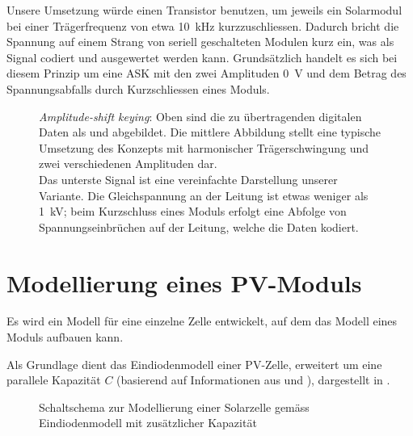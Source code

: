Unsere Umsetzung w\"urde einen Transistor  benutzen, um jeweils ein Solarmodul
bei  einer Tr\"agerfrequenz  von  etwa \SI{10}{\kilo\hertz}  kurzzuschliessen.
Dadurch bricht die Spannung auf  einem Strang von seriell geschalteten Modulen
kurz ein, was als Signal  codiert und ausgewertet werden kann. Grunds\"atzlich
handelt  es sich  bei  diesem Prinzip  um  eine ASK  mit  den zwei  Amplituden
\SI{0}{\volt} und  dem Betrag des Spannungsabfalls  durch Kurzschliessen eines
Moduls.

\begin{figure}[h!tb]
    \centering
    
    \caption{%
        \emph{Amplitude-shift  keying}: Oben   sind  die   zu  \"ubertragenden
        digitalen  Daten als   und   abgebildet. Die  mittlere
        Abbildung stellt eine typische Umsetzung des Konzepts mit harmonischer
        Tr\"agerschwingung und zwei verschiedenen Amplituden dar.\protect\\
        Das  unterste   Signal  ist  eine  vereinfachte   Darstellung  unserer
        Variante.  Die  Gleichspannung an  der Leitung  ist etwas  weniger als
        \SI{1}{\kilo\volt}; beim Kurzschluss eines Moduls erfolgt eine Abfolge
        von Spannungseinbr\"uchen auf der Leitung, welche die Daten kodiert.%
    }
    \label{fig:ask:concept}
\end{figure}


\clearpage
\section{Modellierung eines PV-Moduls}
\label{sec:simu:model:module}

Es wird  ein Modell f\"ur eine  einzelne Zelle entwickelt, auf  dem das Modell
eines  Moduls  aufbauen  kann.

Als   Grundlage   dient   das  Eindiodenmodell   einer   PV-Zelle,   erweitert
um   eine  parallele   Kapazit\"at  $C$   (basierend  auf   Informationen  aus
\cite{ref:solar:scofield}   und   \cite{ref:solar:friesen}),  dargestellt   in
.

\begin{figure}[h!tb]
    \centering
    
    \caption{%
        Schaltschema    zur    Modellierung    einer    Solarzelle    gem\"ass
        Eindiodenmodell mit zus\"atzlicher Kapazit\"at%
    }
    \label{fig:circuit:solarCell}
\end{figure}

